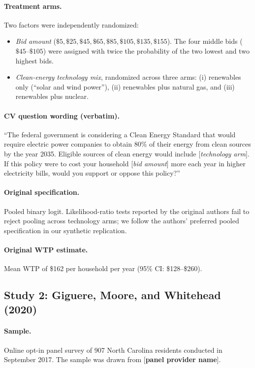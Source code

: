 \documentclass[12pt]{article}
\begin{document}
\paragraph{Treatment arms.} Two factors were independently randomized:
\begin{itemize}[noitemsep]
    \item \textit{Bid amount} ($\$5, \$25, \$45, \$65, \$85, \$105, \$135, \$155$). The four middle bids ($\$45$--$\$105$) were assigned with twice the probability of the two lowest and two highest bids.
    \item \textit{Clean-energy technology mix}, randomized across three arms: (i) renewables only (``solar and wind power''), (ii) renewables plus natural gas, and (iii) renewables plus nuclear.
\end{itemize}

\paragraph{CV question wording (verbatim).} ``The federal government is considering a Clean Energy Standard that would require electric power companies to obtain 80\% of their energy from clean sources by the year 2035. Eligible sources of clean energy would include [\textit{technology arm}]. If this policy were to cost your household [\textit{bid amount}] more each year in higher electricity bills, would you support or oppose this policy?''

\paragraph{Original specification.} Pooled binary logit. Likelihood-ratio tests reported by the original authors fail to reject pooling across technology arms; we follow the authors' preferred pooled specification in our synthetic replication.

\paragraph{Original WTP estimate.} Mean WTP of \$162 per household per year (95\% CI: \$128--\$260).

\subsection{Study 2: Giguere, Moore, and Whitehead (2020)}

\paragraph{Sample.} Online opt-in panel survey of 907 North Carolina residents conducted in September 2017. The sample was drawn from [\textbf{panel provider name}].
\end{document}
